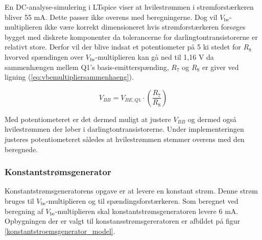 En DC-analyse-simulering i LTspice viser at hvilestrømmen i strømforstærkeren bliver 55 mA. Dette passer ikke overens med beregningerne. Dog vil $V_\mathrm{be}$-multiplieren ikke være korrekt dimensioneret hvis strømforstærkeren forsøges bygget med diskrete komponenter da tolerancerne for darlingtontransistorerne er relativt store. Derfor vil der blive indsat et potentiometer på 5 k\ohm i stedet for $R_8$ hvorved spændingen over $V_\mathrm{be}$-multiplieren kan gå ned til 1,16 V da sammenhængen mellem Q1's basis-emitterspænding, $R_7$ og $R_8$ er giver ved ligning (\ref{eq:vbemultipliersammenhaeng}).

\begin{equation}
V_{BB}=V_{BE,Q1} \cdot (\frac{R_7}{R_8})
\label{eq:vbemultipliersammenhaeng}
\end{equation}

Med potentiometeret er det dermed muligt at justere $V_{BB}$ og dermed også hvilestrømmen der løber i darlingtontransistorerne. Under implementeringen justeres potentiometeret således at hvilestrømmen stemmer overens med den beregnede.

\subsubsection*{Konstantstrømsgenerator}
Konstantstrømsgeneratorens opgave er at levere en konstant strøm. Denne strøm bruges til $V_\mathrm{be}$-multiplieren og til spændingsforstærkeren. Som beregnet ved beregning af $V_{\mathrm{be}}$-multiplieren skal konstantstrømsgeneratoren levere 6 mA. Opbygningen der er valgt til konstansstrømsgereratoren er afbildet på figur \ref{konstantstroemsgenerator_model}.

